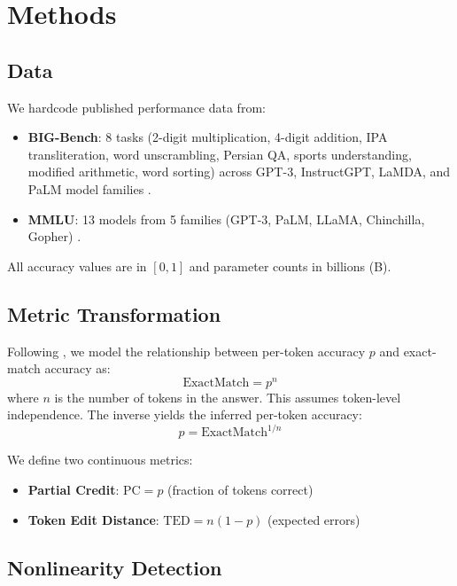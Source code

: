 \documentclass[11pt,a4paper]{article}
\begin{document}
\section{Methods}

\subsection{Data}

We hardcode published performance data from:
\begin{itemize}
    \item \textbf{BIG-Bench}: 8 tasks (2-digit multiplication, 4-digit addition, IPA transliteration, word unscrambling, Persian QA, sports understanding, modified arithmetic, word sorting) across GPT-3, InstructGPT, LaMDA, and PaLM model families \citep{srivastava2023,wei2022}.
    \item \textbf{MMLU}: 13 models from 5 families (GPT-3, PaLM, LLaMA, Chinchilla, Gopher) \citep{hendrycks2021,touvron2023,chowdhery2022,hoffmann2022}.
\end{itemize}

All accuracy values are in $[0, 1]$ and parameter counts in billions (B).

\subsection{Metric Transformation}

Following \citet{schaeffer2023}, we model the relationship between per-token accuracy $p$ and exact-match accuracy as:
\begin{equation}
    \text{ExactMatch} = p^n
\end{equation}
where $n$ is the number of tokens in the answer. This assumes token-level independence. The inverse yields the inferred per-token accuracy:
\begin{equation}
    p = \text{ExactMatch}^{1/n}
\end{equation}

We define two continuous metrics:
\begin{itemize}
    \item \textbf{Partial Credit}: $\text{PC} = p$ (fraction of tokens correct)
    \item \textbf{Token Edit Distance}: $\text{TED} = n(1-p)$ (expected errors)
\end{itemize}

\subsection{Nonlinearity Detection}
\end{document}
